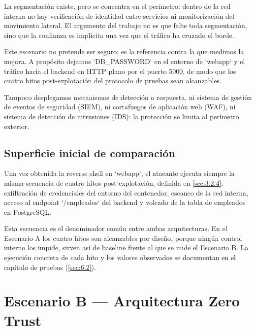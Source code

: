 \documentclass[11pt,spanish,listoffigures,listoftables]{tfgetsinf}
\begin{document}
        La segmentación existe, pero se concentra en el perímetro: dentro de la red interna no hay verificación de identidad entre servicios ni monitorización del movimiento lateral. El argumento del trabajo no es que falte toda segmentación, sino que la confianza es implícita una vez que el tráfico ha cruzado el borde.
        
        Este escenario no pretende ser seguro; es la referencia contra la que medimos la mejora. A propósito dejamos `DB\_PASSWORD` en el entorno de `webapp` y el tráfico hacia el backend en HTTP plano por el puerto 5000, de modo que los cuatro hitos post-explotación del protocolo de pruebas sean alcanzables. 
        
        Tampoco desplegamos mecanismos de detección o respuesta, ni sistema de gestión de eventos de seguridad (SIEM), ni cortafuegos de aplicación web (WAF), ni sistema de detección de intrusiones (IDS): la protección se limita al perímetro exterior.
        
        \subsection{Superficie inicial de comparación}
        \label{sec:4.2.3}
        Una vez obtenida la reverse shell en `webapp`, el atacante ejecuta siempre la misma secuencia de cuatro hitos post-explotación, definida en \cref{sec:3.2.4}: exfiltración de credenciales del entorno del contenedor, escaneo de la red interna, acceso al endpoint `/empleados` del backend y volcado de la tabla de empleados en PostgreSQL.
        
        Esta secuencia es el denominador común entre ambas arquitecturas. En el Escenario A los cuatro hitos son alcanzables por diseño, porque ningún control interno los impide, sirven así de baseline frente al que se mide el Escenario B. La ejecución concreta de cada hito y los valores observados se documentan en el capítulo de pruebas (\cref{sec:6.2}).

    \section{Escenario B — Arquitectura Zero Trust}
\end{document}
